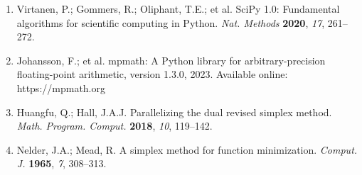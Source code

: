 \documentclass[10pt,a4paper]{article}
\begin{document}
\begin{enumerate}[label={\arabic*.},leftmargin=1.6em,itemsep=1pt]
\item Virtanen, P.; Gommers, R.; Oliphant, T.E.; et al. SciPy 1.0: Fundamental algorithms for scientific computing in Python. \textit{Nat. Methods} \textbf{2020}, \textit{17}, 261--272.
\item Johansson, F.; et al. mpmath: A Python library for arbitrary-precision floating-point arithmetic, version 1.3.0, 2023. Available online: https://mpmath.org
\item Huangfu, Q.; Hall, J.A.J. Parallelizing the dual revised simplex method. \textit{Math. Program. Comput.} \textbf{2018}, \textit{10}, 119--142.
\item Nelder, J.A.; Mead, R. A simplex method for function minimization. \textit{Comput. J.} \textbf{1965}, \textit{7}, 308--313.
\end{enumerate}
\end{document}
